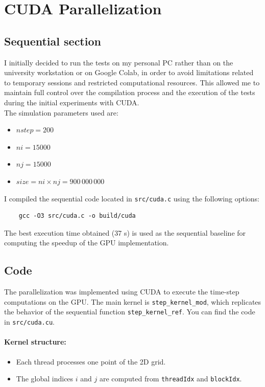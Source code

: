 \newpage
\section{CUDA Parallelization}
\label{sec:parallelization}

\subsection{Sequential section}
I initially decided to run the tests on my personal PC rather than on the university workstation or on Google Colab, in order to avoid limitations related to temporary sessions and restricted computational resources. This allowed me to maintain full control over the compilation process and the execution of the tests during the initial experiments with CUDA.\\

\noindent
The simulation parameters used are:

\begin{itemize}
    \item $nstep = 200$
    \item $ni = 15000$
    \item $nj = 15000$
    \item $size = ni \times nj = 900\,000\,000$
\end{itemize}

\noindent
I compiled the sequential code located in \texttt{src/cuda.c} using the following options:

\begin{verbatim}
    gcc -O3 src/cuda.c -o build/cuda
\end{verbatim}

\noindent
The best execution time obtained (37 s) is used as the sequential baseline for computing the speedup of the GPU implementation.

\subsection{Code}
The parallelization was implemented using CUDA to execute the time-step computations on the GPU. The main kernel is \texttt{step\_kernel\_mod}, which replicates the behavior of the sequential function \texttt{step\_kernel\_ref}. You can find the code in \texttt{src/cuda.cu}.

\paragraph{Kernel structure:}
\begin{itemize}
    \item Each thread processes one point of the 2D grid.
    \item The global indices $i$ and $j$ are computed from \texttt{threadIdx} and \texttt{blockIdx}.
\end{itemize}

